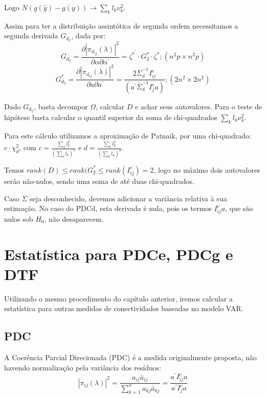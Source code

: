 \documentclass[a4paper,10pt]{article}
\begin{document}
Logo $N (g(\hat{y}) - g(y)) \to \sum_{k} {l_{k} \nu_{k}^{2}}$.

Assim para ter a distribuição assintótica de segunda ordem necessitamos a segunda derivada $G_{d_2}$, dada por:
\begin{equation}
G_{d_2} = \frac{\partial |\pi_{d_{ij}}(\lambda)|^{2}}{\partial \alpha \partial \alpha^{'}} = \zeta^{\ast^{'}} \cdot G_{2}^{\ast} \cdot \zeta^{\ast}; (n^{2}p \times n^{2}p)
\end{equation}
\begin{equation}
G_{d_2}^{\ast} = \frac{\partial |\pi_{d_{ij}}(\lambda)|^{2}}{\partial a \partial a^{'}} = \frac{2 \bar{\Sigma}_{d}^{-1} I_{ij}^{c}}{(a^{'} \bar{\Sigma}_{d}^{-1} I_{j}^{c} a)}; (2n^{2} \times 2n^{2})
\end{equation}

Dado $G_{d_2}$, basta decompor $\Omega$, calcular $D$ e achar seus autovalores. Para o teste de hipótese basta calcular o quantil superior da soma de chi-quadrados $\sum_{k} {l_{k} \nu_{k}^{2}}$. 

Para este cálculo utilizamos a aproximação de Patnaik, por uma chi-quadrado: $c\cdot \chi^2_d$, com $c = \frac{\sum_k {l_k^2}}{(\sum_k {l_k})^2}$ e $d = \frac{\sum_k {l_k^2}}{(\sum_k {l_k})^2}$.

Temos $rank(D) \le rank(G_{2}^{\ast} \le rank(I_{ij}^{c}) = 2$, logo no máximo dois autovalores serão não-nulos, sendo uma soma de até duas chi-quadrados.

Caso $\Sigma$ seja desconhecido, devemos adicionar a variância relativa à sua estimação. No caso do PDCd, esta derivada é nula, pois os termos $I_{ij}^{c} a$, que são nulos sob $H_0$, não desaparecem.


\section{Estatística para PDCe, PDCg e DTF}

Utilizando o mesmo procedimento do capítulo anterior, iremos calcular a estatística para outras medidas de conectividades baseadas no modelo VAR.

\subsection{PDC}

A Coerência Parcial Direcionada (PDC) é a medida originalmente proposta, não havendo normalização pela variância dos resíduos:
\begin{equation}
|\pi_{ij}(\lambda)|^{2} = \frac{a_{ij} \bar{a}_{ij}}{\sum_{k=1}^{n}{a_{kj} \bar{a}_{kj}}} = \frac{a^{'} I_{ij}^{c} a}{a^{'} I_{j}^{c} a}
\end{equation}
\end{document}
